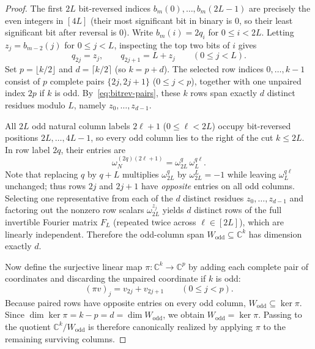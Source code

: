 \documentclass[11pt,reqno]{amsart}
\numberwithin{equation}{section}
\theoremstyle{definition}
\theoremstyle{remark}
\newcommand{\C}{\mathbb{C}}
\begin{document}
\begin{proof}
The first $2L$ bit-reversed indices $b_m(0),\ldots,b_m(2L-1)$ are precisely the even integers in $[4L]$ (their most significant bit in binary is $0$, so their least significant bit after reversal is $0$). Write $b_m(i) = 2q_i$ for $0\le i<2L$. Letting $z_j = b_{m-2}(j)$ for $0\le j<L$, inspecting the top two bits of $i$ gives
\begin{equation}
\label{eq:bitrev-pairs}
q_{2j} = z_j,\qquad q_{2j+1} = L + z_j\qquad (0\le j<L).
\end{equation}
Set $p = \lfloor k/2\rfloor$ and $d = \lceil k/2\rceil$ (so $k = p + d$). The selected row indices $0,\ldots,k-1$ consist of $p$ complete pairs $\{2j,2j+1\}$ ($0\le j<p$), together with one unpaired index $2p$ if $k$ is odd. By~\eqref{eq:bitrev-pairs}, these $k$ rows span exactly $d$ distinct residues modulo $L$, namely $z_0,\ldots,z_{d-1}$.

All $2L$ odd natural column labels $2\ell+1$ ($0\le\ell<2L$) occupy bit-reversed positions $2L,\ldots,4L-1$, so every odd column lies to the right of the cut $k\le 2L$. In row label $2q$, their entries are
\[
\omega_N^{(2q)(2\ell+1)} = \omega_{2L}^q\,\omega_L^{q\ell}.
\]
Note that replacing $q$ by $q+L$ multiplies $\omega_{2L}^q$ by $\omega_{2L}^L=-1$ while leaving $\omega_L^{q\ell}$ unchanged; thus rows $2j$ and $2j+1$ have \emph{opposite} entries on all odd columns. Selecting one representative from each of the $d$ distinct residues $z_0,\ldots,z_{d-1}$ and factoring out the nonzero row scalars $\omega_{2L}^{z_j}$ yields $d$ distinct rows of the full invertible Fourier matrix $F_L$ (repeated twice across $\ell\in[2L]$), which are linearly independent. Therefore the odd-column span $W_{\mathrm{odd}}\subseteq\C^k$ has dimension exactly $d$.

Now define the surjective linear map $\pi:\C^k\to\C^p$ by adding each complete pair of coordinates and discarding the unpaired coordinate if $k$ is odd:
\[
(\pi v)_j = v_{2j} + v_{2j+1}\qquad (0\le j<p).
\]
Because paired rows have opposite entries on every odd column, $W_{\mathrm{odd}}\subseteq \ker\pi$. Since $\dim\ker\pi = k - p = d = \dim W_{\mathrm{odd}}$, we obtain $W_{\mathrm{odd}} = \ker\pi$. Passing to the quotient $\C^k/W_{\mathrm{odd}}$ is therefore canonically realized by applying $\pi$ to the remaining surviving columns.


\end{proof}
\end{document}
